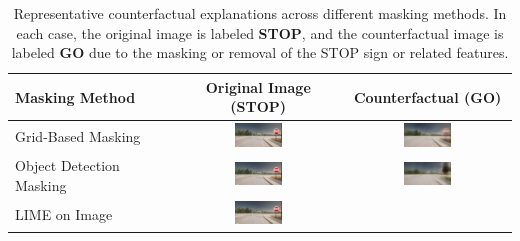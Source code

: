 \begin{table}[htbp]
    \centering
    \caption[Counterfactual examples across masking methods]{%
Representative counterfactual explanations across different masking methods. In each case, the original image is labeled \textbf{STOP}, and the counterfactual image is labeled \textbf{GO} due to the masking or removal of the STOP sign or related features.}
    \label{tab:cf_visual_examples}
    \begin{tabular}{>{\centering\arraybackslash}p{3.5cm} >{\centering\arraybackslash}c >{\centering\arraybackslash}c}
        \toprule
        \textbf{Masking Method} & \textbf{Original Image (STOP)} & \textbf{Counterfactual (GO)} \\
        \midrule
        Grid-Based Masking & 
        \includegraphics[width=0.3\textwidth]{img/masking_results/original.png} & 
        \includegraphics[width=0.3\textwidth]{img/masking_results/grid_cf.png} \\
        \addlinespace
        Object Detection Masking & 
        \includegraphics[width=0.3\textwidth]{img/masking_results/original.png} & 
        \includegraphics[width=0.3\textwidth]{img/masking_results/object_detection_cf.png} \\
        \addlinespace
        LIME on Image & 
        \includegraphics[width=0.3\textwidth]{img/masking_results/original.png} & 

\end{tabular}
\end{table}
